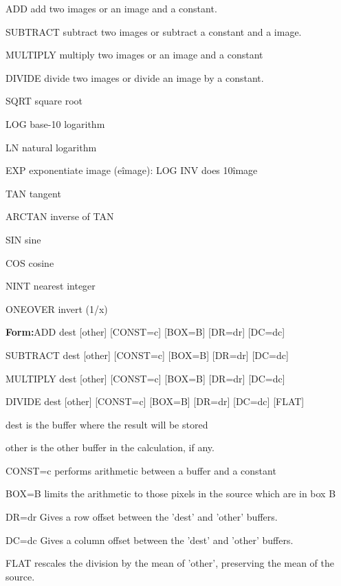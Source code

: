 {\newpage\clearpage
{}%
\begin{example}
  \item[ADD\hfill]{add two images or an image and a constant.}
  \item[SUBTRACT\hfill]{subtract two images or subtract a constant and a 
       image.}
  \item[MULTIPLY\hfill]{multiply two images or an image and a constant}
  \item[DIVIDE\hfill]{divide two images or divide an image by a constant.}
  \item[SQRT\hfill]{square root}
  \item[LOG\hfill]{base-10 logarithm}
  \item[LN\hfill]{natural logarithm}
  \item[EXP\hfill]{exponentiate image (e\^image):  LOG INV does 10\^image}
  \item[TAN\hfill]{tangent}
  \item[ARCTAN\hfill]{inverse of TAN}
  \item[SIN\hfill]{sine}
  \item[COS\hfill]{cosine}
  \item[NINT\hfill]{nearest integer}
  \item[ONEOVER\hfill]{invert (1/x)}
\end{example}%
\lthtmlfigureZ
\lthtmlcheckvsize\clearpage}

{\newpage\clearpage
{}%
\begin{command}
  \item[\textbf{Form:}ADD        dest {[other]} {[CONST=c]} {[BOX=B]} {[DR=dr]} {[DC=dc]}\hfill]{}
  \item[SUBTRACT   dest {[other]} {[CONST=c]} {[BOX=B]} {[DR=dr]} {[DC=dc]}\hfill]{}
  \item[MULTIPLY   dest {[other]} {[CONST=c]} {[BOX=B]} {[DR=dr]} {[DC=dc]}\hfill]{}
  \item[DIVIDE     dest {[other]} {[CONST=c]} {[BOX=B]} {[DR=dr]} {[DC=dc]} {[FLAT]}\hfill]{}
  \item[dest]{is the buffer where the result will be stored}
  \item[other]{is the other buffer in the calculation, if any.}
  \item[CONST=c]{performs arithmetic between a buffer and a constant}
  \item[BOX=B]{limits the arithmetic to those pixels
in the source which are in box B}
  \item[DR=dr]{Gives a row offset between the 'dest' and 'other' buffers.}
  \item[DC=dc]{Gives a column offset between the 'dest' and 'other' buffers.}
  \item[FLAT]{rescales the division by the mean of 'other', preserving the 
mean of the source.}
\end{command}%
\lthtmlfigureZ
\lthtmlcheckvsize\clearpage}

